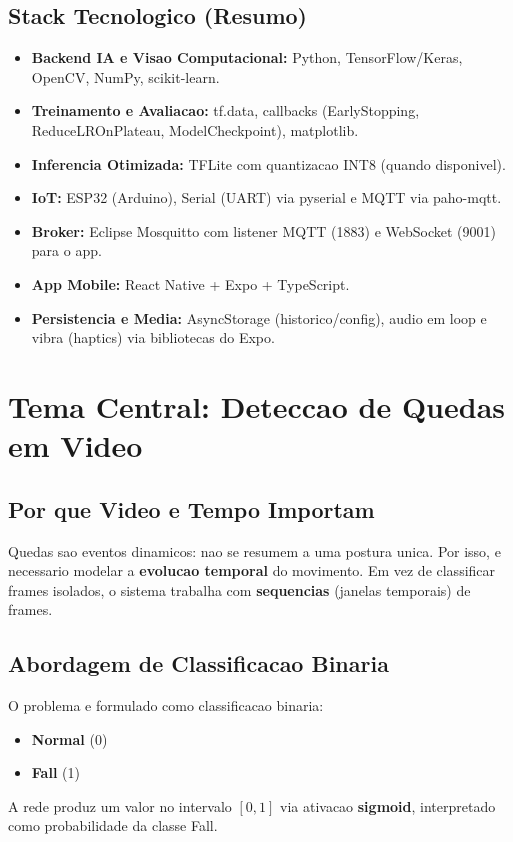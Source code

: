 \subsection{Stack Tecnologico (Resumo)}
\begin{itemize}
  \item \textbf{Backend IA e Visao Computacional:} Python, TensorFlow/Keras, OpenCV, NumPy, scikit-learn.
  \item \textbf{Treinamento e Avaliacao:} tf.data, callbacks (EarlyStopping, ReduceLROnPlateau, ModelCheckpoint), matplotlib.
  \item \textbf{Inferencia Otimizada:} TFLite com quantizacao INT8 (quando disponivel).
  \item \textbf{IoT:} ESP32 (Arduino), Serial (UART) via pyserial e MQTT via paho-mqtt.
  \item \textbf{Broker:} Eclipse Mosquitto com listener MQTT (1883) e WebSocket (9001) para o app.
  \item \textbf{App Mobile:} React Native + Expo + TypeScript.
  \item \textbf{Persistencia e Media:} AsyncStorage (historico/config), audio em loop e vibra (haptics) via bibliotecas do Expo.
\end{itemize}

\section{Tema Central: Deteccao de Quedas em Video}

\subsection{Por que Video e Tempo Importam}
Quedas sao eventos dinamicos: nao se resumem a uma postura unica. Por isso, e necessario modelar a \textbf{evolucao temporal} do movimento. Em vez de classificar frames isolados, o sistema trabalha com \textbf{sequencias} (janelas temporais) de frames.

\subsection{Abordagem de Classificacao Binaria}
O problema e formulado como classificacao binaria:
\begin{itemize}
  \item \textbf{Normal} (0)
  \item \textbf{Fall} (1)
\end{itemize}
A rede produz um valor no intervalo $[0,1]$ via ativacao \textbf{sigmoid}, interpretado como probabilidade da classe Fall.

